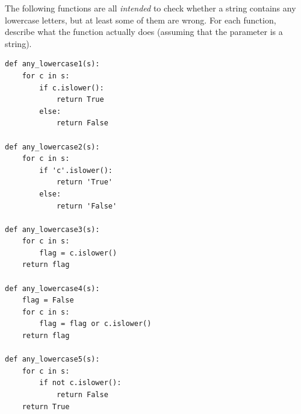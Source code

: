 \documentclass[10pt]{book}
\begin{document}
\begin{exercise}

The following functions are all {\em intended} to check whether a
string contains any lowercase letters, but at least some of them are
wrong.  For each function, describe what the function actually does
(assuming that the parameter is a string).

\begin{verbatim}
def any_lowercase1(s):
    for c in s:
        if c.islower():
            return True
        else:
            return False

def any_lowercase2(s):
    for c in s:
        if 'c'.islower():
            return 'True'
        else:
            return 'False'

def any_lowercase3(s):
    for c in s:
        flag = c.islower()
    return flag

def any_lowercase4(s):
    flag = False
    for c in s:
        flag = flag or c.islower()
    return flag

def any_lowercase5(s):
    for c in s:
        if not c.islower():
            return False
    return True
\end{verbatim}

\end{exercise}
\end{document}
